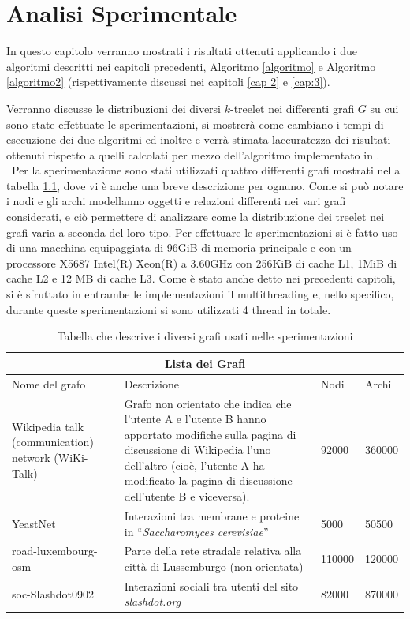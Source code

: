 \chapter{Analisi Sperimentale}
In questo capitolo verranno mostrati i risultati ottenuti applicando i due algoritmi descritti nei capitoli precedenti, Algoritmo \ref{algoritmo} e Algoritmo \ref{algoritmo2} (rispettivamente discussi nei capitoli \ref{cap 2} e \ref{cap:3}).

Verranno discusse le distribuzioni dei diversi $ k $-treelet nei differenti grafi $ G $ su cui sono state effettuate le sperimentazioni, si mostrerà come cambiano i tempi di esecuzione dei due algoritmi ed inoltre e verrà stimata laccuratezza dei risultati ottenuti rispetto a quelli calcolati per mezzo dell'algoritmo implementato in \cite{bressan2019motivo}.\\\
Per la sperimentazione sono stati utilizzati quattro differenti grafi mostrati nella tabella \ref{Tabella:grafo}, dove vi è anche una breve descrizione per ognuno.
Come si può notare i nodi e gli archi modellanno oggetti e relazioni differenti nei vari grafi  considerati, e ciò permettere di analizzare come la distribuzione dei treelet nei grafi varia a seconda del loro tipo.
Per effettuare le sperimentazioni si è fatto uso di una macchina equipaggiata di 96GiB di memoria principale e con un processore X5687 Intel(R) Xeon(R) a 3.60GHz con 256KiB di cache L1, 1MiB di cache L2
e 12 MB di cache L3.
Come è stato anche detto nei precedenti capitoli, si è sfruttato in entrambe le implementazioni il multithreading e, nello specifico, durante queste sperimentazioni si sono utilizzati 4 thread in totale.

\begin{table}
	\small
	\begin{tabular}{|p{4.4cm}|p{6cm}|p{1cm}|p{1cm}| }
		 \hline
		\multicolumn{4}{|c|}{Lista dei Grafi} \\
		\hline
		Nome del grafo & Descrizione & Nodi & Archi\\
		\hline
		\hline
		Wikipedia talk (communication) network (WiKi-Talk) \cite{leskovec2010predicting} & Grafo non orientato che indica che l'utente A e l'utente B hanno apportato modifiche sulla pagina di discussione di Wikipedia l'uno dell'altro (cioè, l'utente A ha modificato la pagina di discussione dell'utente B e viceversa). & 92000 & 360000\\
		\hline
	YeastNet \cite{babu2012interaction} & Interazioni tra membrane e proteine in ``\emph{Saccharomyces  cerevisiae}'' & 5000 & 50500\\
		\hline
		 road-luxembourg-osm \cite{bader2013graph} & Parte della rete stradale relativa alla città di Lussemburgo (non orientata) & 110000 & 120000\\
		 \hline
		 soc-Slashdot0902 \cite{leskovec2009community} &  Interazioni sociali tra utenti del sito \emph{slashdot.org}& 82000 & 870000 \\ 
		 \hline
	\end{tabular}
\caption{Tabella che descrive i diversi grafi usati nelle sperimentazioni}
\label{Tabella:grafo}
\end{table}

